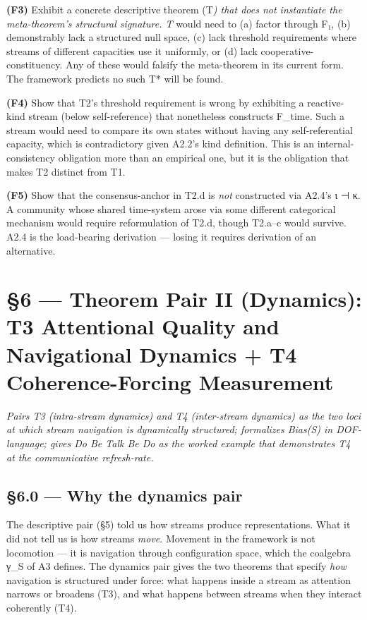 \documentclass[11pt, openany]{book}
\newcommand{\sectionbreak}{\clearpage}
\begin{document}
\textbf{(F3)} Exhibit a concrete descriptive theorem (T\textit{) that does not instantiate the meta-theorem's structural signature. T} would need to (a) factor through F₁, (b) demonstrably lack a structured null space, (c) lack threshold requirements where streams of different capacities use it uniformly, or (d) lack cooperative-constituency. Any of these would falsify the meta-theorem in its current form. The framework predicts no such T* will be found.

\textbf{(F4)} Show that T2's threshold requirement is wrong by exhibiting a reactive-kind stream (below self-reference) that nonetheless constructs F\_\allowbreak{}time. Such a stream would need to compare its own states without having any self-referential capacity, which is contradictory given A2.2's kind definition. This is an internal-consistency obligation more than an empirical one, but it is the obligation that makes T2 distinct from T1.

\textbf{(F5)} Show that the consensus-anchor in T2.d is \textit{not} constructed via A2.4's ι ⊣ κ. A community whose shared time-system arose via some different categorical mechanism would require reformulation of T2.d, though T2.a–c would survive. A2.4 is the load-bearing derivation --- losing it requires derivation of an alternative.

\chapter{§6 — Theorem Pair II (Dynamics): T3 Attentional Quality and Navigational Dynamics + T4 Coherence-Forcing Measurement}


\textit{Pairs T3 (intra-stream dynamics) and T4 (inter-stream dynamics) as the two loci at which stream navigation is dynamically structured; formalizes Bias(S) in DOF-language; gives Do Be Talk Be Do as the worked example that demonstrates T4 at the communicative refresh-rate.}

\sectionbreak

\section{§6.0 --- Why the dynamics pair}

The descriptive pair (§5) told us how streams produce representations. What it did not tell us is how streams \textit{move}. Movement in the framework is not locomotion --- it is navigation through configuration space, which the coalgebra γ\_\allowbreak{}S of A3 defines. The dynamics pair gives the two theorems that specify \textit{how} navigation is structured under force: what happens inside a stream as attention narrows or broadens (T3), and what happens between streams when they interact coherently (T4).
\end{document}
